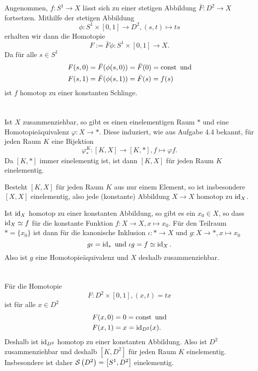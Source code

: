 \documentclass[a4paper,10pt]{article}
\begin{document}
Angenommen, $f: S^1 \to X$ lässt sich zu einer stetigen Abbildung $\bar{F} : D^2 \to X$ fortsetzen. Mithilfe der stetigen Abbildung
\[
 \phi: S^1 \times [0,1] \to D^2, (s,t) \mapsto ts
\]
erhalten wir dann die Homotopie
\[
 F := \bar{F} \phi : S^1 \times [0,1] \to X.
\]
Da für alle $s \in S^1$
\begin{align*}
 F(s,0) &= \bar{F}(\phi(s,0)) = \bar{F}(0) = \operatorname{const} \text{ und} \\
 F(s,1) &= \bar{F}(\phi(s,1)) = \bar{F}(s) = f(s)
\end{align*}
ist $f$ homotop zu einer konstanten Schlinge.





\section{}
Ist $X$ zusammenziehbar, so gibt es einen einelementigen Raum $\ast$ und eine Homotopieäquivalenz $\varphi : X \to \ast$. Diese induziert, wie aus Aufgabe 4.4 bekannt, für jeden Raum $K$ eine Bijektion
\[
 \varphi^K_* :  [K,X] \to [K,\ast], f \mapsto \varphi f.
\]
Da $[K, \ast]$ immer einelementig ist, ist dann $[K,X]$ für jeden Raum $K$ einelementig.

Besteht $[K,X]$ für jeden Raum $K$ aus nur einem Element, so ist insbesondere $[X,X]$ einelementig, also jede (konstante) Abbildung $X \to X$ homotop zu $\operatorname{id}_X$.

Ist $\operatorname{id}_X$ homotop zu einer konstanten Abbildung, so gibt es ein $x_0 \in X$, so dass $\operatorname{id}_X \simeq f$ für die konstante Funktion $f : X \to X, x \mapsto x_0$. Für den Teilraum $\ast = \{x_0\}$ ist dann für die kanonische Inklusion $\iota : \ast \to X$ und $g : X \to \ast, x \mapsto x_0$
\[
 g \iota = \operatorname{id}_{\ast} \text{ und } \iota g = f \simeq \operatorname{id}_X.
\]
Also ist $g$ eine Homotopieäquivalenz und $X$ deshalb zusammenziehbar.






\section{}


\subsection{}
Für die Homotopie
\[
 F: D^2 \times [0,1], (x,t) = tx
\]
ist für alle $x \in D^2$
\begin{align*}
 F(x,0) &= 0 = \operatorname{const} \text{ und}\\
 F(x,1) &= x = \operatorname{id}_{D^2}(x).
\end{align*}
Deshalb ist $\operatorname{id}_{D^2}$ homotop zu einer konstanten Abbildung. Also ist $D^2$ zusammenziehbar und deshalb $\left[ K,D^2 \right]$ für jeden Raum $K$ einelementig. Insbesondere ist daher $\mathcal{S}\left(D^2\right) = \left[ S^1, D^2 \right]$ einelementig.
\end{document}
